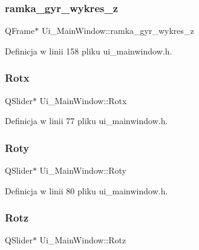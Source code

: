 \subsubsection{\texorpdfstring{ramka\+\_\+gyr\+\_\+wykres\+\_\+z}{ramka\_gyr\_wykres\_z}}
{\footnotesize\ttfamily Q\+Frame$\ast$ Ui\+\_\+\+Main\+Window\+::ramka\+\_\+gyr\+\_\+wykres\+\_\+z}



Definicja w linii 158 pliku ui\+\_\+mainwindow.\+h.

\mbox{\label{class_ui___main_window_a72eff817e22aca744b94f7ffe1a2b612}} 
\subsubsection{\texorpdfstring{Rotx}{Rotx}}
{\footnotesize\ttfamily Q\+Slider$\ast$ Ui\+\_\+\+Main\+Window\+::\+Rotx}



Definicja w linii 77 pliku ui\+\_\+mainwindow.\+h.

\mbox{\label{class_ui___main_window_ad0d84017170ff9d9b25ac2ec7dbd4018}} 
\subsubsection{\texorpdfstring{Roty}{Roty}}
{\footnotesize\ttfamily Q\+Slider$\ast$ Ui\+\_\+\+Main\+Window\+::\+Roty}



Definicja w linii 80 pliku ui\+\_\+mainwindow.\+h.

\mbox{\label{class_ui___main_window_a7d94d709ceb1cbfd5b0baf55c5aca2f1}} 
\subsubsection{\texorpdfstring{Rotz}{Rotz}}
{\footnotesize\ttfamily Q\+Slider$\ast$ Ui\+\_\+\+Main\+Window\+::\+Rotz}



